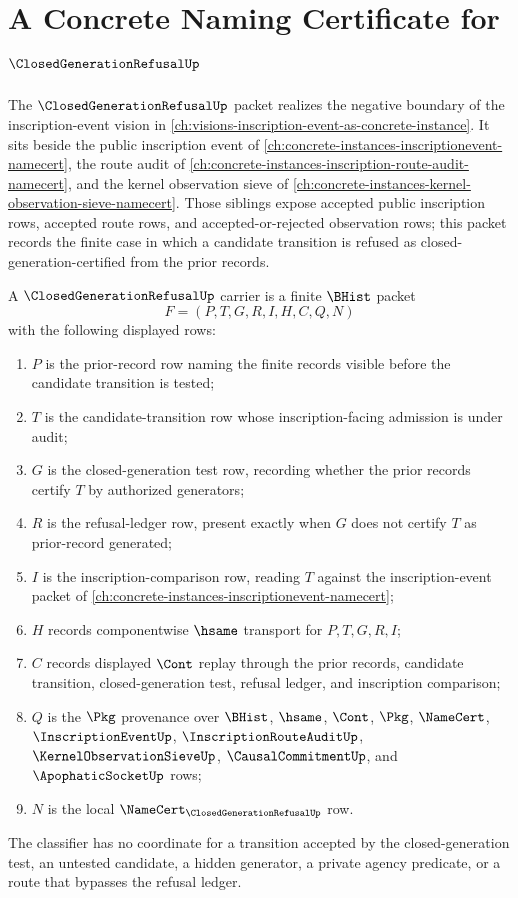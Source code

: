 \chapter{A Concrete Naming Certificate for $\ClosedGenerationRefusalUp$}
\label{ch:concrete-instances-closed-generation-refusal-namecert}

The $\ClosedGenerationRefusalUp$ packet realizes the negative boundary of
the inscription-event vision in
\autoref{ch:visions-inscription-event-as-concrete-instance}. It sits beside
the public inscription event of
\autoref{ch:concrete-instances-inscriptionevent-namecert}, the route audit of
\autoref{ch:concrete-instances-inscription-route-audit-namecert}, and the
kernel observation sieve of
\autoref{ch:concrete-instances-kernel-observation-sieve-namecert}. Those
siblings expose accepted public inscription rows, accepted route rows, and
accepted-or-rejected observation rows; this packet records the finite case in
which a candidate transition is refused as closed-generation-certified from
the prior records.

\begin{definition}
\label{def:closed-generation-refusal-carrier}
A $\ClosedGenerationRefusalUp$ carrier is a finite $\BHist$ packet
$$
F=(P,T,G,R,I,H,C,Q,N)
$$
with the following displayed rows:
\begin{enumerate}
\item $P$ is the prior-record row naming the finite records visible before the candidate transition is tested;
\item $T$ is the candidate-transition row whose inscription-facing admission is under audit;
\item $G$ is the closed-generation test row, recording whether the prior records certify $T$ by authorized generators;
\item $R$ is the refusal-ledger row, present exactly when $G$ does not certify $T$ as prior-record generated;
\item $I$ is the inscription-comparison row, reading $T$ against the inscription-event packet of \autoref{ch:concrete-instances-inscriptionevent-namecert};
\item $H$ records componentwise $\hsame$ transport for $P,T,G,R,I$;
\item $C$ records displayed $\Cont$ replay through the prior records, candidate transition, closed-generation test, refusal ledger, and inscription comparison;
\item $Q$ is the $\Pkg$ provenance over $\BHist$, $\hsame$, $\Cont$, $\Pkg$, $\NameCert$, $\InscriptionEventUp$, $\InscriptionRouteAuditUp$, $\KernelObservationSieveUp$, $\CausalCommitmentUp$, and $\ApophaticSocketUp$ rows;
\item $N$ is the local $\NameCert_{\ClosedGenerationRefusalUp}$ row.
\end{enumerate}
The classifier has no coordinate for a transition accepted by the
closed-generation test, an untested candidate, a hidden generator, a private
agency predicate, or a route that bypasses the refusal ledger.
\end{definition}

